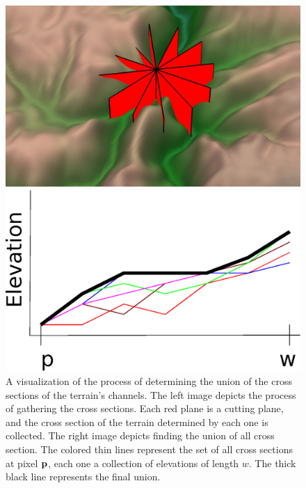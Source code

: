 \begin{figure}[t]
\begin{center}
  \begin{minipage}{0.49\linewidth} \includegraphics[width=0.99\linewidth]{images/crossSection.jpg}  \end{minipage}
  \begin{minipage}{0.49\linewidth} \includegraphics[width=0.99\linewidth]{images/CrossSections_2.eps} \end{minipage}
\end{center}
\caption[A visualization of the process of determining the union of the cross sections of the terrain's channels]{\label{figure:cross_section} A visualization of the process of determining the union of the cross sections of the terrain's channels. The left image depicts the process of gathering the cross sections. Each red plane is a cutting plane, and the cross section of the terrain determined by each one is collected. The right image depicts finding the union of all cross section. The colored thin lines represent the set of all cross sections at pixel $\bf{p}$, each one a collection of elevations of length $w$. The thick black line represents the final union.  }
\end{figure}

